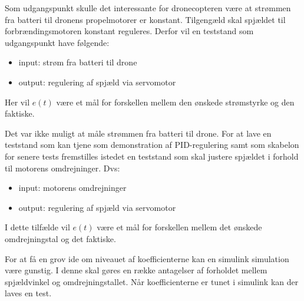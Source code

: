 
Som udgangspunkt skulle det interessante for dronecopteren være at %
strømmen fra batteri til dronens propelmotorer er konstant. Tilgengæld skal spjældet til forbrændingsmotoren konstant reguleres. Derfor vil en teststand som udgangspunkt have følgende:
\begin{itemize}
\item input: strøm fra batteri til drone
\item output: regulering af spjæld via servomotor
\end{itemize}

Her vil $e(t)$ være et mål for forskellen mellem den ønskede strømstyrke og den faktiske.

Det var ikke muligt at måle strømmen fra batteri til drone. For at lave en teststand som kan tjene som demonstration af PID-regulering samt som skabelon for senere tests fremstilles istedet en teststand som skal justere spjældet i forhold til motorens omdrejninger. Dvs:

\begin{itemize}
\item input: motorens omdrejninger
\item output: regulering af spjæld via servomotor
\end{itemize}

I dette tilfælde vil $e(t)$ være et mål for forskellen mellem det ønskede omdrejningstal og det faktiske.

For at få en grov ide om niveauet af koefficienterne kan en simulink simulation være gunstig. I denne skal gøres en række antagelser af forholdet mellem spjældvinkel og omdrejningstallet. Når koefficienterne er tunet i simulink kan der laves en test.



